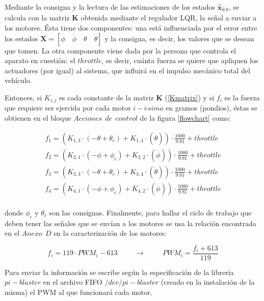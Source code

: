 \documentclass[twoside,11pt]{book}
\begin{document}
Mediante la consigna y la lectura de las estimaciones de los estados $\hat{\pmb{x}}_{k|k}$, se calcula con la matriz $\pmb{K}$ obtenida mediante el regulador LQR, la señal a enviar a los motores. Ésta tiene dos componentes: una está influenciada por el error entre los estados  $\pmb{X}=[\phi \quad \dot{\phi} \quad \theta \quad \dot{\theta}]$ y la consigna, es decir, los valores que se desean que tomen. La otra componente viene dada por la persona que controla el aparato en cuestión: el $throttle$, es decir, cuánta fuerza se quiere que apliquen los actuadores (por igual) al sistema, que influirá en el impulso mecánico total del vehículo. 

Entonces, si $K_{i,j}$ es cada constante de la matriz $\pmb{K}$ (\ref{Kmatrix}) y si $f_i$ es la fuerza que requiere ser ejercida por cada motor $i-\acute{e}simo$ en gramos (pondios), éstas se obtienen en el bloque $Acciones\>\>de\>\>control$ de la figura \ref{flowchart} como: 

\begin{equation}
\begin{array}{l}
f_1=(K_{1,3}\cdot(-\theta+\theta_{c})+K_{1,4}\cdot(\dot{\theta}))\cdot \frac{1000}{9.81}+throttle \\
f_2=(K_{2,1}\cdot(-\phi+\phi_{c})+K_{2,2}\cdot(\dot{\phi}))\cdot \frac{1000}{9.81}+throttle \\
f_3=(K_{3,3}\cdot(-\theta+\theta_{c})+K_{3,4}\cdot(\dot{\theta}))\cdot \frac{1000}{9.81}+throttle \\
f_4=(K_{4,1}\cdot(-\phi+\phi_{c})+K_{4,2}\cdot(\dot{\phi}))\cdot \frac{1000}{9.81}+throttle \\ \end{array}
\end{equation}

donde $\phi_{c}$ y $\theta_{c}$ son las consignas. Finalmente, para hallar el ciclo de trabajo que deben tener las señales que se envían a los motores se usa la relación encontrada en el $Anexo\>\>D$ en la caracterización de los motores:

\begin{equation}
f_{i}=119\cdot PWM_{i} -613 \hspace{1cm} \longrightarrow \hspace{1cm}  PWM_{i}=\frac{f_{i}+613}{119}
\end{equation}

Para enviar la información se escribe según la especificación de la librería $pi-blaster$ en el archivo FIFO $/dev/pi-blaster$ (creado en la instalación de la misma) el PWM al que funcionará cada motor.
\end{document}
